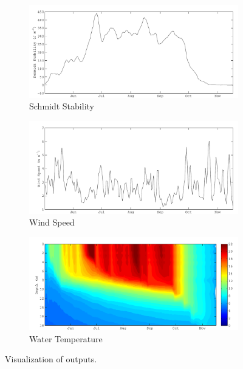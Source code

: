 \begin{figure}
\begin{subfigure}{\lafigsize}
      \caption{\label{fig:la:out:St}Schmidt Stability}
      \includegraphics[width = \linewidth]{figures/Sparkling_St.pdf}
    \end{subfigure}
    \begin{subfigure}{\lafigsize}
      \caption{\label{fig:la:out:wndSpd}Wind Speed}
      \includegraphics[width = \linewidth]{figures/Sparkling_wndSpd.pdf}
    \end{subfigure}
    \begin{subfigure}{\lafigsize}
      \caption{\label{fig:la:out:wTemp}Water Temperature}
      \includegraphics[width = \linewidth]{figures/Sparkling_wTemp.pdf}
    \end{subfigure}
    \caption{\label{fig:la:outputs:2}Visualization of \la outputs.}
  \end{figure}

